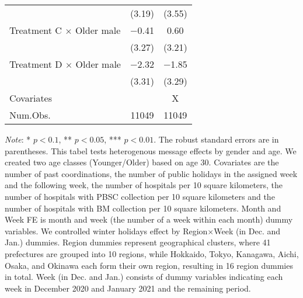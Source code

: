 \documentclass[12pt, a4paper]{article}
\begin{document}
\begin{table}[H]
\begin{threeparttable}
\begin{tabular}[t]{lcc}
 & (\num{3.19}) & (\num{3.55})\\
Treatment C $\times$ Older male & \num{-0.41} & \num{0.60}\\
 & (\num{3.27}) & (\num{3.21})\\
Treatment D $\times$ Older male & \num{-2.32} & \num{-1.85}\\
 & (\num{3.31}) & (\num{3.29})\\
\midrule
Covariates &  & X\\
Num.Obs. & \num{11049} & \num{11049}\\
\bottomrule
\end{tabular}
\begin{tablenotes}
\item \emph{Note}: * $p < 0.1$, ** $p < 0.05$, *** $p < 0.01$. The robust standard errors are in parentheses. This tabel tests heterogenous message effects by gender and age. We created two age classes (Younger/Older) based on age 30. Covariates are the number of past coordinations, the number of public holidays in the assigned week and the following week, the number of hospitals per 10 square kilometers, the number of hospitals with PBSC collection per 10 square kilometers and the number of hospitals with BM collection per 10 square kilometers. Month and Week FE is month and week (the number of a week within each month) dummy variables. We controlled winter holidays effect by Region$\times$Week (in Dec. and Jan.) dummies. Region dummies represent geographical clusters, where 41 prefectures are grouped into 10 regions, while Hokkaido, Tokyo, Kanagawa, Aichi, Osaka, and Okinawa each form their own region, resulting in 16 region dummies in total. Week (in Dec. and Jan.) consists of dummy variables indicating each week in December 2020 and January 2021 and the remaining period.
\end{tablenotes}
\end{threeparttable}
\end{table}
\end{document}
